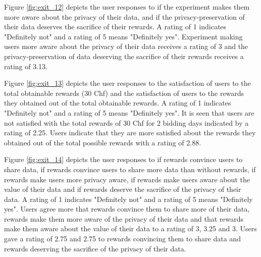 Figure \ref{fig:exit_12} depicts the user responses to if the experiment makes them more aware about the privacy of their data, and if the privacy-preservation of their data deserves the sacrifice of their rewards. A rating of 1 indicates "Definitely not" and a rating of 5 means "Definitely yes". Experiment making users more aware about the privacy of their data receives a rating of 3 and the privacy-preservation of data deserving the sacrifice of their rewards receives a rating of 3.13.

Figure \ref{fig:exit_13} depicts the user responses to the satisfaction of users to the total obtainable rewards (30 Chf) and the satisfaction of users to the rewards they obtained out of the total obtainable rewards. A rating of 1 indicates "Definitely not" and a rating of 5 means "Definitely yes". It is seen that users are not satisfied with the total rewards of 30 Chf for 2 bidding days indicated by a rating of 2.25. Users indicate that they are more satisfied about the rewards they obtained out of the total possible rewards with a rating of 2.88. 

Figure \ref{fig:exit_14} depicts the user responses to if rewards convince users to share data, if rewards convince users to share more data than without rewards, if rewards make users more privacy aware, if rewards make users aware about the value of their data and if rewards deserve the sacrifice of the privacy of their data.  A rating of 1 indicates "Definitely not" and a rating of 5 means "Definitely yes". Users agree more that rewards convince them to share more of their data, rewards make them more aware of the privacy of their data and that rewards make them aware about the value of their data to a rating of 3, 3.25 and 3. Users gave a rating of 2.75 and 2.75 to rewards convincing them to share data and rewards deserving the sacrifice of the privacy of their data. 

